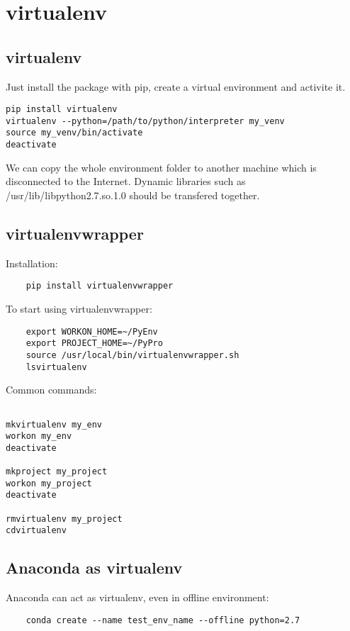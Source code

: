 \section{virtualenv}

\subsection{virtualenv}
Just install the package with pip, create a virtual environment and activite it.
\begin{verbatim}
pip install virtualenv
virtualenv --python=/path/to/python/interpreter my_venv
source my_venv/bin/activate
deactivate
\end{verbatim}

We can copy the whole environment folder to another machine which is disconnected to the Internet. 
Dynamic libraries such as /usr/lib/libpython2.7.so.1.0  should be transfered together.


\subsection{virtualenvwrapper}

Installation:
\begin{verbatim}
    pip install virtualenvwrapper
\end{verbatim}

To start using virtualenvwrapper:
\begin{verbatim}
    export WORKON_HOME=~/PyEnv
    export PROJECT_HOME=~/PyPro
    source /usr/local/bin/virtualenvwrapper.sh
    lsvirtualenv
\end{verbatim}



Common commands:
\begin{verbatim}
    
mkvirtualenv my_env
workon my_env
deactivate

mkproject my_project
workon my_project
deactivate

rmvirtualenv my_project
cdvirtualenv

\end{verbatim}


\subsection{Anaconda as virtualenv}

Anaconda can act as virtualenv, even in offline environment:
\begin{verbatim}
    conda create --name test_env_name --offline python=2.7
\end{verbatim}
